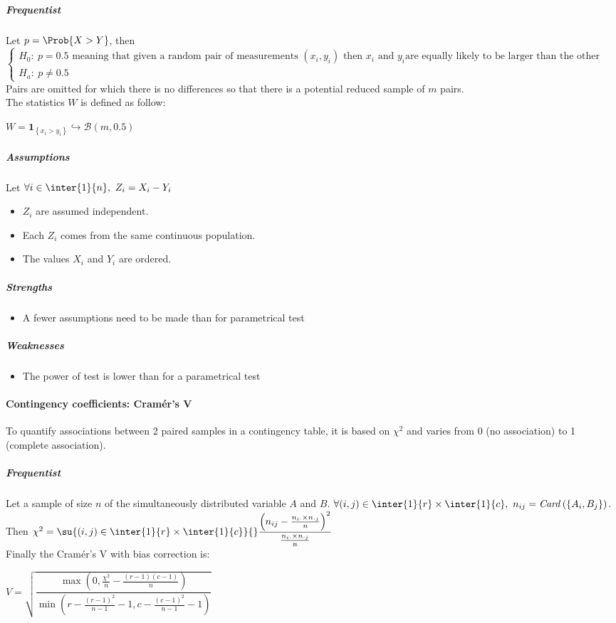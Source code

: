 \subparagraph{Frequentist}
Let $p=\Prob{X>Y}$, then
$\begin{cases}
    H_{0}:~p=0.5\text{ meaning that given a random pair of measurements }(x_{i}, y_{i})
    \text{ then }x_{i}\text{ and }y_{i}\text{are equally likely to be larger than the
    other}\\
    H_{a}:~p\neq 0.5
\end{cases}$
Pairs are omitted for which there is no differences so that there is a potential reduced
sample of $m$ pairs.\\
The statistics $W$ is defined as follow:
\begin{center}
    $W = \mathbf{1}_{\left\{x_{i} > y_{i}\right\}} \hookrightarrow \mathcal{B}(m, 0.5)$
\end{center}

\subparagraph{Assumptions}
Let $\forall i\in\inter{1}{n},~Z_{i} = X_{i} - Y_{i}$

\begin{itemize}
    \item $Z_{i}$ are assumed independent.
    \item Each $Z_{i}$ comes from the same continuous population.
    \item The values $X_{i}$ and $Y_{i}$ are ordered.
\end{itemize}

\subparagraph{Strengths}
\begin{itemize}
    \item A fewer assumptions need to be made than for parametrical test
\end{itemize}

\subparagraph{Weaknesses}
\begin{itemize}
    \item The power of test is lower than for a parametrical test
\end{itemize}



\paragraph{Contingency coefficients: Cramér's V}
To quantify associations between 2 paired samples in a contingency table, it is based
on $\chi^{2}$ and varies from 0 (no association) to 1 (complete association).
\subparagraph{Frequentist}
Let a sample of size $n$ of the simultaneously distributed variable $A$ and $B$.
$\forall (i,j)\in\inter{1}{r}\times\inter{1}{c},~n_{ij} = \text{\emph{Card}}\left(
\left\{A_{i},B_{j}\right\}\right)$.
Then $\chi^{2} = \su{(i,j)\in\inter{1}{r}\times\inter{1}{c}}{}\dfrac{\left(n_{ij} - \frac{
n_{i\cdot}\times n_{\cdot j}}{n}\right)^{2}}{\frac{n_{i\cdot}\times n_{\cdot j}}{n}}$\\
Finally the Cramér's V with bias correction is: 
\begin{center}
    $V = \sqrt{\dfrac{\max\left(0, \frac{\chi^{2}}{n} - \frac{(r-1)(c-1)}{n}\right)}{\min\left(r-\frac{(r-1)^{2}}{n-1}-1, c-\frac{(c-1)^{2}}{n-1}-1\right)}}$
\end{center}

